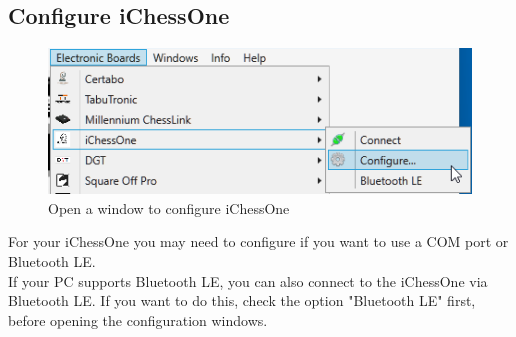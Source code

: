 \documentclass[11pt,a4paper]{article}
\begin{document}
\subsection{Configure iChessOne} \label{ConfigureIChessOne}
\begin{figure}[H]
	\centering
	\includegraphics[scale=1.0]{iChessOne1.png}
	\caption{Open a window to configure iChessOne }
	\label{fig:iChessOne1}
\end{figure}

For your iChessOne you may need to configure if you want to use a COM port or Bluetooth LE.\\
If your PC supports Bluetooth LE, you can also connect to the iChessOne via Bluetooth LE. If you want to do this, check the option "Bluetooth LE" first, before opening the configuration windows.\\
\end{document}
